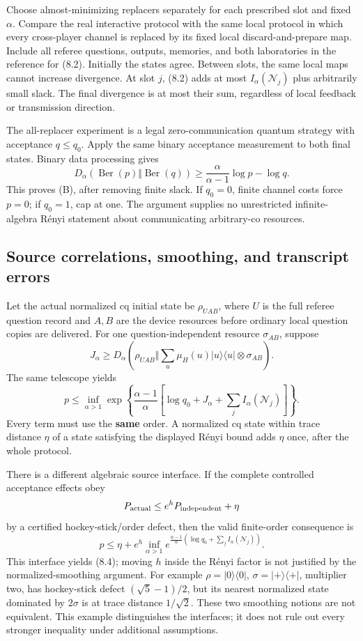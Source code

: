 \documentclass[11pt,reqno]{amsart}
\numberwithin{equation}{section}
\begin{document}
Choose almost-minimizing replacers separately for each prescribed slot and fixed \(\alpha\). Compare the real interactive protocol with the same local protocol in which every cross-player channel is replaced by its fixed local discard-and-prepare map. Include all referee questions, outputs, memories, and both laboratories in the reference for (8.2). Initially the states agree. Between slots, the same local maps cannot increase divergence. At slot \(j\), (8.2) adds at most \(I_\alpha(\mathcal N_j)\) plus arbitrarily small slack. The final divergence is at most their sum, regardless of local feedback or transmission direction.

The all-replacer experiment is a legal zero-communication quantum strategy with acceptance \(q\le q_0\). Apply the same binary acceptance measurement to both final states. Binary data processing gives \[
 D_\alpha(\operatorname{Ber}(p)\Vert\operatorname{Ber}(q))
 \ge\frac{\alpha}{\alpha-1}\log p-\log q.
\] This proves (B), after removing finite slack. If \(q_0=0\), finite channel costs force \(p=0\); if \(q_0=1\), cap at one. The argument supplies no unrestricted infinite-algebra Rényi statement about communicating arbitrary-co resources.

\subsection{Source correlations, smoothing, and transcript errors}\label{source-correlations-smoothing-and-transcript-errors}

Let the actual normalized cq initial state be \(\rho_{UAB}\), where \(U\) is the full referee question record and \(A,B\) are the device resources before ordinary local question copies are delivered. For one question-independent resource \(\sigma_{AB}\), suppose \[
 J_\alpha\ge D_\alpha(\rho_{UAB}\Vert
        \sum_u\mu_H(u)|u\rangle\langle u|\otimes\sigma_{AB}).
\] The same telescope yields \[
 p\le\inf_{\alpha>1}\exp\!\left\{
 \frac{\alpha-1}{\alpha}
 [\log q_0+J_\alpha+\sum_jI_\alpha(\mathcal N_j)]\right\}. \tag{8.3}
\] Every term must use the \textbf{same} order. A normalized cq state within trace distance \(\eta\) of a state satisfying the displayed Rényi bound adds \(\eta\) once, after the whole protocol.

There is a different algebraic source interface. If the complete controlled acceptance effects obey \[
 P_{\rm actual}\le e^hP_{\rm independent}+\eta
\] by a certified hockey-stick/order defect, then the valid finite-order consequence is \[
 p\le\eta+e^h
 \inf_{\alpha>1}
 e^{\frac{\alpha-1}{\alpha}(\log q_0+\sum_jI_\alpha(\mathcal N_j))}. \tag{8.4}
\] This interface yields (8.4); moving \(h\) inside the Rényi factor is not justified by the normalized-smoothing argument. For example \(\rho=|0\rangle\langle0|\), \(\sigma=|+\rangle\langle+|\), multiplier two, has hockey-stick defect \((\sqrt5-1)/2\), but its nearest normalized state dominated by \(2\sigma\) is at trace distance \(1/\sqrt2\). These two smoothing notions are not equivalent. This example distinguishes the interfaces; it does not rule out every stronger inequality under additional assumptions.
\end{document}
